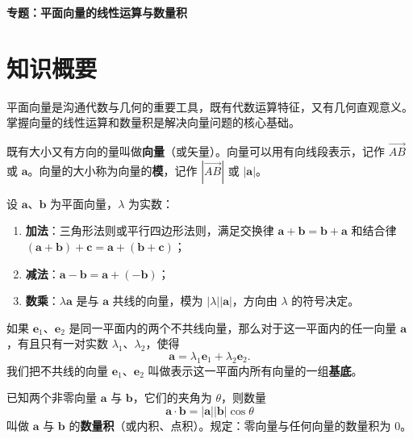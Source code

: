 \documentclass[11pt]{ctexrep}
\begin{document}
\begin{center}
    {\LARGE\bfseries 专题：平面向量的线性运算与数量积}
\end{center}

\section*{知识概要}

平面向量是沟通代数与几何的重要工具，既有代数运算特征，又有几何直观意义。掌握向量的线性运算和数量积是解决向量问题的核心基础。

\begin{definition}[向量的概念]
    既有大小又有方向的量叫做\textbf{向量}（或矢量）。向量可以用有向线段表示，记作 $\overrightarrow{AB}$ 或 $\boldsymbol{a}$。向量的大小称为向量的\textbf{模}，记作 $|\overrightarrow{AB}|$ 或 $|\boldsymbol{a}|$。
\end{definition}

\begin{definition}[向量的线性运算]
    设 $\boldsymbol{a}$、$\boldsymbol{b}$ 为平面向量，$\lambda$ 为实数：
    \begin{enumerate}
        \item \textbf{加法}：三角形法则或平行四边形法则，满足交换律 $\boldsymbol{a} + \boldsymbol{b} = \boldsymbol{b} + \boldsymbol{a}$ 和结合律 $(\boldsymbol{a} + \boldsymbol{b}) + \boldsymbol{c} = \boldsymbol{a} + (\boldsymbol{b} + \boldsymbol{c})$；
        \item \textbf{减法}：$\boldsymbol{a} - \boldsymbol{b} = \boldsymbol{a} + (-\boldsymbol{b})$；
        \item \textbf{数乘}：$\lambda\boldsymbol{a}$ 是与 $\boldsymbol{a}$ 共线的向量，模为 $|\lambda||\boldsymbol{a}|$，方向由 $\lambda$ 的符号决定。
    \end{enumerate}
\end{definition}

\begin{definition}[平面向量基本定理]
    如果 $\boldsymbol{e}_1$、$\boldsymbol{e}_2$ 是同一平面内的两个不共线向量，那么对于这一平面内的任一向量 $\boldsymbol{a}$，有且只有一对实数 $\lambda_1$、$\lambda_2$，使得
    \[
        \boldsymbol{a} = \lambda_1\boldsymbol{e}_1 + \lambda_2\boldsymbol{e}_2.
    \]
    我们把不共线的向量 $\boldsymbol{e}_1$、$\boldsymbol{e}_2$ 叫做表示这一平面内所有向量的一组\textbf{基底}。
\end{definition}

\begin{definition}[向量的数量积]
    已知两个非零向量 $\boldsymbol{a}$ 与 $\boldsymbol{b}$，它们的夹角为 $\theta$，则数量
    \[
        \boldsymbol{a} \cdot \boldsymbol{b} = |\boldsymbol{a}||\boldsymbol{b}|\cos\theta
    \]
    叫做 $\boldsymbol{a}$ 与 $\boldsymbol{b}$ 的\textbf{数量积}（或内积、点积）。规定：零向量与任何向量的数量积为 $0$。
\end{definition}
\end{document}
